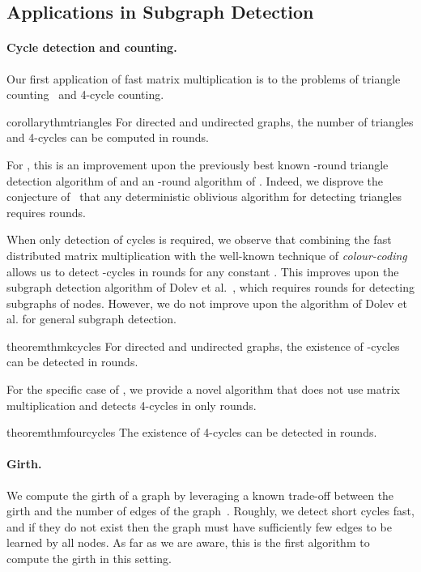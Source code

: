 \subsection{Applications in Subgraph Detection}

\paragraph{Cycle detection and counting.}
Our first application of fast matrix multiplication is to the problems of triangle counting~\cite{itai1978finding} and 4-cycle counting. 

\begin{restatable}{corollary}{thmtriangles}\label{cor:triangles}
    For directed and undirected graphs, the number of triangles and 4-cycles can be computed in  rounds.
\end{restatable}

For , this is an improvement upon the previously best known -round triangle detection algorithm of \citet{tritri} and an -round algorithm of \citet{drucker13}. Indeed, we disprove the conjecture of~\citet{tritri} that any deterministic oblivious algorithm for detecting triangles requires  rounds.

When only detection of cycles is required, we observe that combining the fast distributed matrix multiplication with the well-known technique of \emph{colour-coding} \cite{alon1995color} allows us to detect -cycles in  rounds for any constant . This improves upon the subgraph detection algorithm of Dolev et al.~\cite{tritri}, which requires  rounds for detecting subgraphs of  nodes. However, we do not improve upon the algorithm of Dolev et al. for general subgraph detection.

\begin{restatable}{theorem}{thmkcycles}\label{thm:k-cycles}
For directed and undirected graphs, the existence of -cycles can be detected in  rounds.
\end{restatable}

For the specific case of , we provide a novel algorithm that does not use matrix multiplication and detects 4-cycles in only  rounds.

\begin{restatable}{theorem}{thmfourcycles}\label{thm:4-cycles}
The existence of 4-cycles can be detected in  rounds.
\end{restatable}




\paragraph{Girth.}
We compute the girth of a graph by leveraging a known trade-off between the girth and the number of edges of the graph~\cite{Matousek02_geometry}. Roughly, we detect short cycles fast, and if they do not exist then the graph must have sufficiently few edges to be learned by all nodes. As far as we are aware, this is the first algorithm to compute the girth in this setting.

